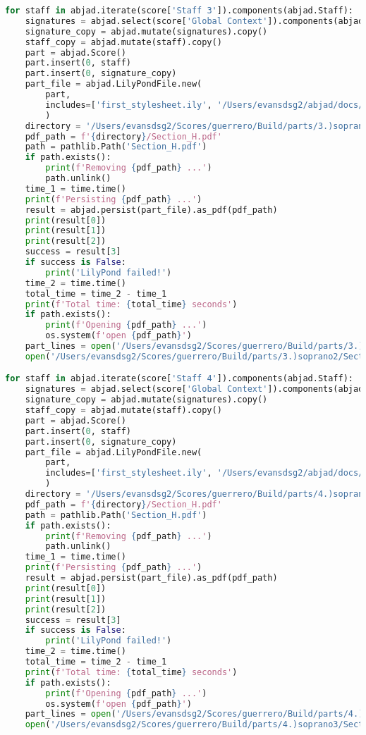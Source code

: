 \begin{lstlisting}[language=Python, caption=Invocation Source Code]
for staff in abjad.iterate(score['Staff 3']).components(abjad.Staff):
    signatures = abjad.select(score['Global Context']).components(abjad.Staff)
    signature_copy = abjad.mutate(signatures).copy()
    staff_copy = abjad.mutate(staff).copy()
    part = abjad.Score()
    part.insert(0, staff)
    part.insert(0, signature_copy)
    part_file = abjad.LilyPondFile.new(
        part,
        includes=['first_stylesheet.ily', '/Users/evansdsg2/abjad/docs/source/_stylesheets/abjad.ily'],
        )
    directory = '/Users/evansdsg2/Scores/guerrero/Build/parts/3.)soprano2'
    pdf_path = f'{directory}/Section_H.pdf'
    path = pathlib.Path('Section_H.pdf')
    if path.exists():
        print(f'Removing {pdf_path} ...')
        path.unlink()
    time_1 = time.time()
    print(f'Persisting {pdf_path} ...')
    result = abjad.persist(part_file).as_pdf(pdf_path)
    print(result[0])
    print(result[1])
    print(result[2])
    success = result[3]
    if success is False:
        print('LilyPond failed!')
    time_2 = time.time()
    total_time = time_2 - time_1
    print(f'Total time: {total_time} seconds')
    if path.exists():
        print(f'Opening {pdf_path} ...')
        os.system(f'open {pdf_path}')
    part_lines = open('/Users/evansdsg2/Scores/guerrero/Build/parts/3.)soprano2/Section_H.ly').readlines()
    open('/Users/evansdsg2/Scores/guerrero/Build/parts/3.)soprano2/Section_H.ly', 'w').writelines(part_lines[15:-1])

for staff in abjad.iterate(score['Staff 4']).components(abjad.Staff):
    signatures = abjad.select(score['Global Context']).components(abjad.Staff)
    signature_copy = abjad.mutate(signatures).copy()
    staff_copy = abjad.mutate(staff).copy()
    part = abjad.Score()
    part.insert(0, staff)
    part.insert(0, signature_copy)
    part_file = abjad.LilyPondFile.new(
        part,
        includes=['first_stylesheet.ily', '/Users/evansdsg2/abjad/docs/source/_stylesheets/abjad.ily'],
        )
    directory = '/Users/evansdsg2/Scores/guerrero/Build/parts/4.)soprano3'
    pdf_path = f'{directory}/Section_H.pdf'
    path = pathlib.Path('Section_H.pdf')
    if path.exists():
        print(f'Removing {pdf_path} ...')
        path.unlink()
    time_1 = time.time()
    print(f'Persisting {pdf_path} ...')
    result = abjad.persist(part_file).as_pdf(pdf_path)
    print(result[0])
    print(result[1])
    print(result[2])
    success = result[3]
    if success is False:
        print('LilyPond failed!')
    time_2 = time.time()
    total_time = time_2 - time_1
    print(f'Total time: {total_time} seconds')
    if path.exists():
        print(f'Opening {pdf_path} ...')
        os.system(f'open {pdf_path}')
    part_lines = open('/Users/evansdsg2/Scores/guerrero/Build/parts/4.)soprano3/Section_H.ly').readlines()
    open('/Users/evansdsg2/Scores/guerrero/Build/parts/4.)soprano3/Section_H.ly', 'w').writelines(part_lines[15:-1])


\end{lstlisting}
